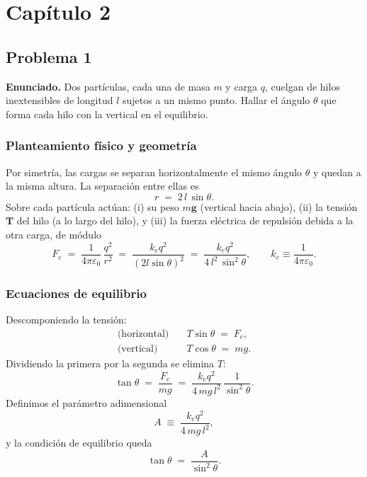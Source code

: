 \documentclass{article}
\begin{document}
\section{Capítulo 2} \vspace{0.5cm}

\subsection{Problema 1} \vspace{0.5cm}

\textbf{Enunciado.} Dos partículas, cada una de masa $m$ y carga $q$, cuelgan de hilos inextensibles de longitud $l$ sujetos a un mismo punto. Hallar el ángulo $\theta$ que forma cada hilo con la vertical en el equilibrio.

\subsubsection*{Planteamiento físico y geometría}
Por simetría, las cargas se separan horizontalmente el mismo ángulo $\theta$ y quedan a la misma altura. La separación entre ellas es
\begin{equation}\label{eq:distancia}
r \;=\; 2\,l\,\sin\theta.
\end{equation}
Sobre cada partícula actúan: (i) su peso $m\mathbf g$ (vertical hacia abajo), (ii) la tensión $\mathbf T$ del hilo (a lo largo del hilo), y (iii) la fuerza eléctrica de repulsión debida a la otra carga, de módulo
\begin{equation}\label{eq:Fe}
F_e \;=\; \frac{1}{4\pi\varepsilon_0}\,\frac{q^2}{r^2}
\;=\; \frac{k_e q^2}{(2l\sin\theta)^2}
\;=\; \frac{k_e q^2}{4\,l^2\,\sin^2\theta},
\qquad k_e \equiv \frac{1}{4\pi\varepsilon_0}.
\end{equation}

\subsubsection*{Ecuaciones de equilibrio}
Descomponiendo la tensión:
\begin{equation}\label{eq:equilibrio_comp}
\begin{aligned}
\text{(horizontal)}\quad & T\sin\theta \;=\; F_e,\\
\text{(vertical)}\quad & T\cos\theta \;=\; mg.
\end{aligned}
\end{equation}
Dividiendo la primera por la segunda se elimina $T$:
\begin{equation}\label{eq:tan}
\tan\theta \;=\; \frac{F_e}{mg}
\;=\; \frac{k_e q^2}{4\,m g\, l^2}\,\frac{1}{\sin^2\theta}.
\end{equation}
Definimos el parámetro adimensional
\begin{equation}\label{eq:Adef}
A \;\equiv\; \frac{k_e q^2}{4\,m g\, l^2},
\end{equation}
y la condición de equilibrio queda
\begin{equation}\label{eq:cond_equilibrio}
\tan\theta \;=\; \frac{A}{\sin^2\theta}.
\end{equation}
\end{document}
